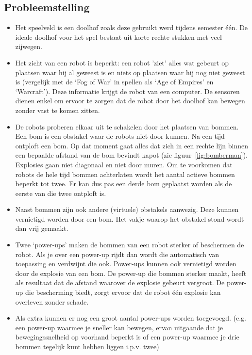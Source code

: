 \documentclass[t1]{penoverslag}
\begin{document}
\subsection{Probleemstelling}
\begin{itemize}
\item
Het speelveld is een doolhof zoals deze gebruikt werd tijdens semester \'e\'en. De ideale doolhof voor het spel bestaat uit korte rechte stukken met veel zijwegen.

\item
Het zicht van een robot is beperkt: een robot 'ziet' alles wat gebeurt op plaatsen waar hij al geweest is en niets op plaatsen waar hij nog niet geweest is (vergelijk met de `Fog of War' in spellen als `Age of Empires' en `Warcraft'). Deze informatie krijgt de robot van een computer. De sensoren dienen enkel om ervoor te zorgen dat de robot door het doolhof kan bewegen zonder vast te komen zitten.

\item
De robots proberen elkaar uit te schakelen door het plaatsen van bommen. Een bom is een obstakel waar de robots niet door kunnen. Na een tijd ontploft een bom. Op dat moment gaat alles dat zich in een rechte lijn binnen een bepaalde afstand van de bom bevindt kapot (zie figuur~\ref{fig:bomberman}). Explosies gaan niet diagonaal en niet door muren. Om te voorkomen dat robots de hele tijd bommen achterlaten wordt het aantal actieve bommen beperkt tot twee. Er kan dus pas een derde bom geplaatst worden als de eerste van die twee ontploft is.

\item
Naast bommen zijn ook andere (virtuele) obstakels aanwezig. Deze kunnen vernietigd worden door een bom. Het vakje waarop het obstakel stond wordt dan vrij gemaakt.

\item
Twee `power-ups' maken de bommen van een robot sterker of beschermen de robot. Als je over een power-up rijdt dan wordt die automatisch van toepassing en verdwijnt die ook. Power-ups kunnen ook vernietigd worden door de explosie van een bom. De power-up die bommen sterker maakt, heeft als resultaat dat de afstand waarover de explosie gebeurt vergroot. De power-up die bescherming biedt, zorgt ervoor dat de robot \'e\'en explosie kan overleven zonder schade.

\item
Als extra kunnen er nog een groot aantal power-ups worden toegevoegd. (e.g. een power-up waarmee je sneller kan bewegen, ervan uitgaande dat je bewegingssnelheid op voorhand beperkt is of een power-up waarmee je drie bommen tegelijk kunt hebben liggen i.p.v. twee)
\end{itemize}
\end{document}
